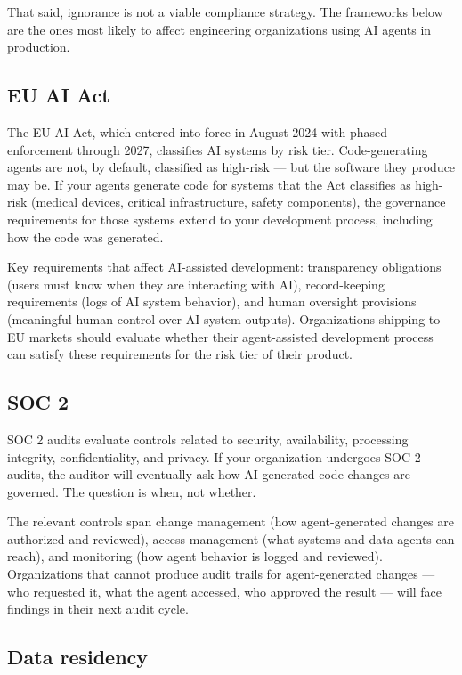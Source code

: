 \documentclass[
  a4paper,
  DIV=11,
  numbers=noendperiod]{scrreprt}
\begin{document}
That said, ignorance is not a viable compliance strategy. The frameworks
below are the ones most likely to affect engineering organizations using
AI agents in production.

\subsection{EU AI Act}\label{eu-ai-act}

The EU AI Act, which entered into force in August 2024 with phased
enforcement through 2027, classifies AI systems by risk tier.
Code-generating agents are not, by default, classified as high-risk ---
but the software they produce may be. If your agents generate code for
systems that the Act classifies as high-risk (medical devices, critical
infrastructure, safety components), the governance requirements for
those systems extend to your development process, including how the code
was generated.

Key requirements that affect AI-assisted development: transparency
obligations (users must know when they are interacting with AI),
record-keeping requirements (logs of AI system behavior), and human
oversight provisions (meaningful human control over AI system outputs).
Organizations shipping to EU markets should evaluate whether their
agent-assisted development process can satisfy these requirements for
the risk tier of their product.

\subsection{SOC 2}\label{soc-2}

SOC 2 audits evaluate controls related to security, availability,
processing integrity, confidentiality, and privacy. If your organization
undergoes SOC 2 audits, the auditor will eventually ask how AI-generated
code changes are governed. The question is when, not whether.

The relevant controls span change management (how agent-generated
changes are authorized and reviewed), access management (what systems
and data agents can reach), and monitoring (how agent behavior is logged
and reviewed). Organizations that cannot produce audit trails for
agent-generated changes --- who requested it, what the agent accessed,
who approved the result --- will face findings in their next audit
cycle.

\subsection{Data residency}\label{data-residency}
\end{document}
